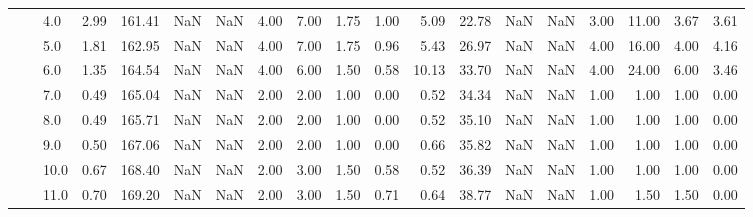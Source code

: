 \begin{tabular}{lllrrrrrrrrrrrrrrrr}
       &     & 4.0  &      2.99 &     161.41 &               NaN &                NaN &  4.00 &   7.00 &             1.75 &                         1.00 &      5.09 &      22.78 &               NaN &                NaN &  3.00 &  11.00 &             3.67 &                         3.61 \\
       &     & 5.0  &      1.81 &     162.95 &               NaN &                NaN &  4.00 &   7.00 &             1.75 &                         0.96 &      5.43 &      26.97 &               NaN &                NaN &  4.00 &  16.00 &             4.00 &                         4.16 \\
       &     & 6.0  &      1.35 &     164.54 &               NaN &                NaN &  4.00 &   6.00 &             1.50 &                         0.58 &     10.13 &      33.70 &               NaN &                NaN &  4.00 &  24.00 &             6.00 &                         3.46 \\
       &     & 7.0  &      0.49 &     165.04 &               NaN &                NaN &  2.00 &   2.00 &             1.00 &                         0.00 &      0.52 &      34.34 &               NaN &                NaN &  1.00 &   1.00 &             1.00 &                         0.00 \\
       &     & 8.0  &      0.49 &     165.71 &               NaN &                NaN &  2.00 &   2.00 &             1.00 &                         0.00 &      0.52 &      35.10 &               NaN &                NaN &  1.00 &   1.00 &             1.00 &                         0.00 \\
       &     & 9.0  &      0.50 &     167.06 &               NaN &                NaN &  2.00 &   2.00 &             1.00 &                         0.00 &      0.66 &      35.82 &               NaN &                NaN &  1.00 &   1.00 &             1.00 &                         0.00 \\
       &     & 10.0 &      0.67 &     168.40 &               NaN &                NaN &  2.00 &   3.00 &             1.50 &                         0.58 &      0.52 &      36.39 &               NaN &                NaN &  1.00 &   1.00 &             1.00 &                         0.00 \\
       &     & 11.0 &      0.70 &     169.20 &               NaN &                NaN &  2.00 &   3.00 &             1.50 &                         0.71 &      0.64 &      38.77 &               NaN &                NaN &  1.00 &   1.50 &             1.50 &                         0.00 \\

\end{tabular}
